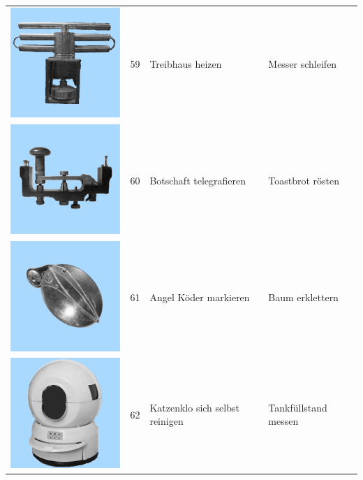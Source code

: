 \documentclass[
  english,
  man,floatsintext]{apa7}
\begin{document}
\begin{center}
\begin{ThreePartTable}
\begin{longtable}{llll}
\includegraphics[valign=c, scale=0.19]{../materials/unfamiliar/59.png} & 59 & Treibhaus heizen & Messer schleifen\\
\includegraphics[valign=c, scale=0.19]{../materials/unfamiliar/60.png} & 60 & Botschaft telegrafieren & Toastbrot rösten\\
\includegraphics[valign=c, scale=0.19]{../materials/unfamiliar/61.png} & 61 & Angel Köder markieren & Baum erklettern\\
\includegraphics[valign=c, scale=0.19]{../materials/unfamiliar/62.png} & 62 & Katzenklo sich selbst reinigen & Tankfüllstand messen\\

\end{longtable}
\end{ThreePartTable}
\end{center}
\end{document}
